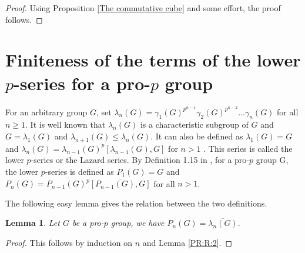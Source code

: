 \documentclass[12pt]{elsarticle}
\newtheorem{lemma}[theorem]{Lemma}
\newtheorem*{main corollary*}{Main Corollary}
\theoremstyle{definition}
\begin{document}
 \begin{proof}
     Using Proposition \ref{The commutative cube} and some effort, the proof follows.
 \end{proof}

\section{Finiteness of the terms of the lower $p$-series for a pro-$p$ group} \label{section: finiteness of lower p series}
 For an arbitrary group $G$, set $\lambda_n(G)=\gamma_1(G)^{p^{n-1}}\gamma_2(G)^{p^{n-2}} \ldots \gamma_n(G)$ for all $n\geq 1$. It is well known that $\lambda_n(G)$ is a characteristic subgroup of $G$ and $G=\lambda_1(G)$ and $\lambda_{n+1}(G)\leqslant\lambda_n(G)$. It can also be defined as $\lambda_1(G)= G$ and $\lambda_n(G)=\lambda_{n-1}(G)^p[\lambda_{n-1}(G),G] $ for $n> 1$
 . This series is called the lower $p$-series or the Lazard series. By Definition 1.15 in \cite{DDMS99}, for a pro-$p$ group G, the lower $p$-series is defined as $P_1(G)=G$ and $P_{n}(G)=\overline{P_{n-1}(G)^p} \overline{[P_{n-1}(G),G]} $ for all $n>1$.


The following easy lemma gives the relation between the two definitions.
\begin{lemma}\label{PR:L:1}
        Let $G$ be a pro-$p$ group, we have $P_n(G)= \overline{\lambda_n(G)}.$
\end{lemma}
\begin{proof}
        This follows by induction on $n$ and Lemma \ref{PR:R:2}.
\end{proof}
\end{document}

